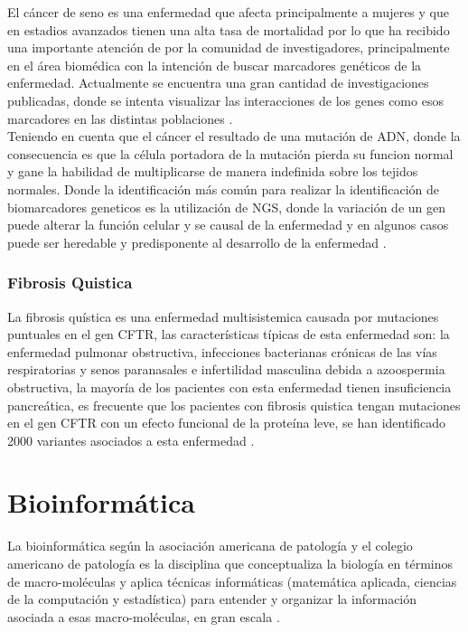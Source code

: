 {El cáncer de seno es una enfermedad que afecta principalmente a mujeres y que en estadios avanzados tienen una alta tasa de mortalidad por lo que ha recibido una importante atención de por la comunidad de investigadores, principalmente en el área biomédica con la intención de buscar marcadores genéticos de la enfermedad. Actualmente se encuentra una gran cantidad de investigaciones publicadas, donde se intenta visualizar las interacciones de los genes como esos marcadores en las distintas poblaciones \cite{Jurca2016}.\\

Teniendo en cuenta que el cáncer el resultado de una mutación de ADN, donde la consecuencia es que la célula portadora de la mutación pierda su funcion normal y gane la habilidad de multiplicarse de manera indefinida sobre los tejidos normales. Donde la identificación más común para realizar la identificación de biomarcadores geneticos es la utilización de NGS, donde la variación de un gen puede alterar la función celular y se causal de la enfermedad y en algunos casos puede ser heredable y predisponente al desarrollo de la enfermedad \cite{Jurca2016,Wenger2017}.


\subsubsection*{Fibrosis Quistica}

La fibrosis quística es una enfermedad multisistemica causada por mutaciones puntuales en el gen CFTR, las características típicas de esta enfermedad son: la enfermedad pulmonar obstructiva, infecciones bacterianas crónicas de las vías respiratorias y senos paranasales e infertilidad masculina debida  a azoospermia obstructiva, la mayoría de los pacientes con esta enfermedad tienen insuficiencia pancreática, es frecuente que los pacientes con fibrosis quistica tengan mutaciones en el gen CFTR con un efecto funcional de la proteína leve, se han identificado 2000 variantes asociados a esta enfermedad \cite{Terlizzi2017}. 


\section{Bioinformática}


La bioinformática según la asociación americana de patología y el colegio americano de patología es la disciplina que conceptualiza la biología en términos de macro-moléculas y aplica técnicas informáticas (matemática aplicada, ciencias de la computación y estadística) para entender y organizar la información asociada a esas macro-moléculas, en gran escala \cite{Roy2018}.\\  
 
}
